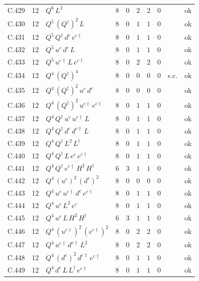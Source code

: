 {\begin{longtable}{@{}ll>{\raggedright\arraybackslash}p{6.4cm}rrllllr@{}}
C.429 & 12 & $Q^{6}\,L^{2}$ & 8 & 0 & $2$ & $2$ & $0$ &  & ok \\
C.430 & 12 & $Q^{5}\,(Q^\dagger)^{2}\,L$ & 8 & 0 & $1$ & $1$ & $0$ &  & ok \\
C.431 & 12 & $Q^{5}\,Q^\dagger\,d^c\,e^{c\dagger}$ & 8 & 0 & $1$ & $1$ & $0$ &  & ok \\
C.432 & 12 & $Q^{5}\,u^c\,d^c\,L$ & 8 & 0 & $1$ & $1$ & $0$ &  & ok \\
C.433 & 12 & $Q^{5}\,u^{c\dagger}\,L\,e^{c\dagger}$ & 8 & 0 & $2$ & $2$ & $0$ &  & ok \\
C.434 & 12 & $Q^{4}\,(Q^\dagger)^{4}$ & 8 & 0 & $0$ & $0$ & $0$ & s.c. & ok \\
C.435 & 12 & $Q^{4}\,(Q^\dagger)^{2}\,u^c\,d^c$ & 8 & 0 & $0$ & $0$ & $0$ &  & ok \\
C.436 & 12 & $Q^{4}\,(Q^\dagger)^{2}\,u^{c\dagger}\,e^{c\dagger}$ & 8 & 0 & $1$ & $1$ & $0$ &  & ok \\
C.437 & 12 & $Q^{4}\,Q^\dagger\,u^c\,u^{c\dagger}\,L$ & 8 & 0 & $1$ & $1$ & $0$ &  & ok \\
C.438 & 12 & $Q^{4}\,Q^\dagger\,d^c\,d^{c\dagger}\,L$ & 8 & 0 & $1$ & $1$ & $0$ &  & ok \\
C.439 & 12 & $Q^{4}\,Q^\dagger\,L^{2}\,L^\dagger$ & 8 & 0 & $1$ & $1$ & $0$ &  & ok \\
C.440 & 12 & $Q^{4}\,Q^\dagger\,L\,e^c\,e^{c\dagger}$ & 8 & 0 & $1$ & $1$ & $0$ &  & ok \\
C.441 & 12 & $Q^{4}\,Q^\dagger\,e^{c\dagger}\,H^{2}\,H^\dagger$ & 6 & 3 & $1$ & $1$ & $0$ &  & ok \\
C.442 & 12 & $Q^{4}\,(u^c)^{2}\,(d^c)^{2}$ & 8 & 0 & $0$ & $0$ & $0$ &  & ok \\
C.443 & 12 & $Q^{4}\,u^c\,u^{c\dagger}\,d^c\,e^{c\dagger}$ & 8 & 0 & $1$ & $1$ & $0$ &  & ok \\
C.444 & 12 & $Q^{4}\,u^c\,L^{2}\,e^c$ & 8 & 0 & $1$ & $1$ & $0$ &  & ok \\
C.445 & 12 & $Q^{4}\,u^c\,L\,H^{2}\,H^\dagger$ & 6 & 3 & $1$ & $1$ & $0$ &  & ok \\
C.446 & 12 & $Q^{4}\,(u^{c\dagger})^{2}\,(e^{c\dagger})^{2}$ & 8 & 0 & $2$ & $2$ & $0$ &  & ok \\
C.447 & 12 & $Q^{4}\,u^{c\dagger}\,d^{c\dagger}\,L^{2}$ & 8 & 0 & $2$ & $2$ & $0$ &  & ok \\
C.448 & 12 & $Q^{4}\,(d^c)^{2}\,d^{c\dagger}\,e^{c\dagger}$ & 8 & 0 & $1$ & $1$ & $0$ &  & ok \\
C.449 & 12 & $Q^{4}\,d^c\,L\,L^\dagger\,e^{c\dagger}$ & 8 & 0 & $1$ & $1$ & $0$ &  & ok \\

\end{longtable}}
